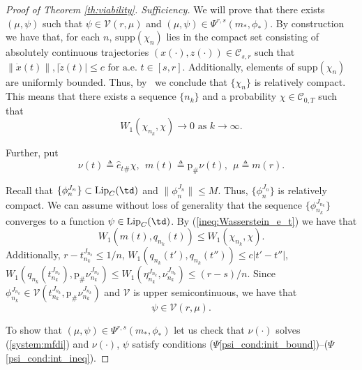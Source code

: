 \documentclass[a4paper,12pt]{article}
\begin{document}
\begin{proof}[Proof of Theorem \ref{th:viability}. Sufficiency]
	
	We will prove that there exists $(\mu,\psi)$ such that $\psi\in \mathcal{V}(r,\mu)$ and $(\mu,\psi)\in \Psi^{r,s}(m_*,\phi_*)$.
	By construction we have that, for each $n$, $\mathrm{supp}(\chi_n)$ lies in the compact set consisting of absolutely continuous trajectories $(x(\cdot),z(\cdot))\in \mathcal{C}_{s,r}$ such that $\|\dot{x}(t)\|,|\dot{z}(t)|\leq c\text{ for a.e. }t\in [s,r]$. 
	Additionally, elements of $\mathrm{supp}(\chi_n)$ are uniformly bounded. Thus, by~\cite[Proposition 7.1.5]{Ambrosio} we conclude that $\{\chi_n\}$ is relatively compact. This means that there exists a sequence $\{n_k\}$ and a probability $\chi\in\mathcal{C}_{0,T}$ such that
	\begin{equation}\label{conv:chi_n_k_chi}
	W_1(\chi_{n_k},\chi)\rightarrow 0\text{ as }k\rightarrow \infty.
	\end{equation} 
	
	Further, put
	\begin{equation*}\label{intro_fin_suff:m}
	\nu(t)\triangleq \hat{e}_t{}_\#\chi,\ \ m(t)\triangleq \mathrm{p}_\#\nu(t),\ \  \mu\triangleq m(r). 
	\end{equation*}
	
	Recall that $\{\phi_n^{J_n}\}\subset\mathrm{Lip}_C(\td)$ and  $\|\phi^{J_n}_n\|\leq M$. Thus, $\{\phi_{n}^{J_n}\}$ is relatively compact.  We can assume without loss of generality that the sequence $\{\phi_{n_k}^{J_{n_k}}\}$ converges to a function $\psi\in \mathrm{Lip}_C(\td)$. By (\ref{ineq:Wasserstein_e_t}) we have that
	\begin{equation}\label{ineq:m_q_nk}
	W_1(m(t),q_{n_k}(t))\leq W_1(\chi_{n_k},\chi). 
	\end{equation} Additionally, $r-t_{n_k}^{J_{n_k}}\leq 1/n$,
	$W_1(q_{n_k}(t'),q_{n_k}(t''))\leq c|t'-t''|$, $W_1(q_{n_k}(t_{n_k}^{J_{n_k}}),\mathrm{p}_\# \nu_{n_k}^{J_{n_k}} )\leq W_1(\eta_{n_k}^{J_{n_k}},\nu_{n_k}^{J_{n_k}})\leq (r-s)/n$. Since
	$\phi_{n_k}^{J_{n_k}}\in\mathcal{V}(t_{n_k}^{J_{n_k}},\mathrm{p}_\# \nu_{n_k}^{J_{n_k}})$ and $\mathcal{V}$ is upper semicontinuous, we have that
	\begin{equation}\label{incl_fin_suff:psi_limit_V}
	\psi\in \mathcal{V}(r,\mu).
	\end{equation}
	
	To show that $(\mu,\psi)\in \Psi^{r,s}(m_*,\phi_*)$ let us check that $\nu(\cdot)$ solves (\ref{system:mfdi}) and $\nu(\cdot)$, $\psi$ satisfy conditions ($\Psi$\ref{psi_cond:init_bound})--($\Psi$\ref{psi_cond:int_ineq}).
	

\end{proof}
\end{document}
